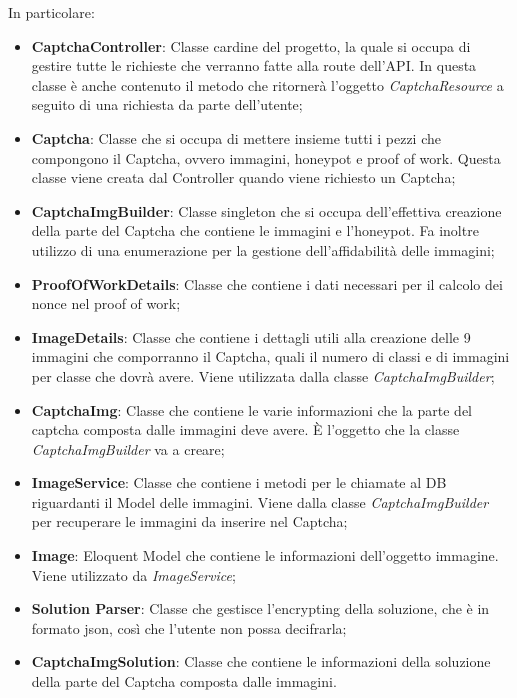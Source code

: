 In particolare:
\begin{itemize}
    \item \textbf{CaptchaController}: Classe cardine del progetto, la quale si occupa di gestire tutte le richieste che verranno fatte alla route dell'API. In questa classe è anche contenuto il metodo che ritornerà l'oggetto \textit{CaptchaResource} a seguito di una richiesta da parte dell'utente;
    \item \textbf{Captcha}: Classe che si occupa di mettere insieme tutti i pezzi che compongono il Captcha, ovvero immagini, honeypot e proof of work. Questa classe viene creata dal Controller quando viene richiesto un Captcha;
    \item \textbf{CaptchaImgBuilder}: Classe singleton che si occupa dell'effettiva creazione della parte del Captcha che contiene le immagini e l'honeypot. Fa inoltre utilizzo di una enumerazione per la gestione dell'affidabilità delle immagini;
    \item \textbf{ProofOfWorkDetails}: Classe che contiene i dati necessari per il calcolo dei nonce nel proof of work;
    \item \textbf{ImageDetails}: Classe che contiene i dettagli utili alla creazione delle 9 immagini che comporranno il Captcha, quali il numero di classi e di immagini per classe che dovrà avere. Viene utilizzata dalla classe \textit{CaptchaImgBuilder};
    \item \textbf{CaptchaImg}: Classe che contiene le varie informazioni che la parte del captcha composta dalle immagini deve avere. È l'oggetto che la classe \textit{CaptchaImgBuilder} va a creare;
    \item \textbf{ImageService}: Classe che contiene i metodi per le chiamate al DB riguardanti il Model delle immagini. Viene dalla classe \textit{CaptchaImgBuilder} per recuperare le immagini da inserire nel Captcha;
    \item \textbf{Image}: Eloquent Model che contiene le informazioni dell'oggetto immagine. Viene utilizzato da \textit{ImageService};
    \item \textbf{Solution Parser}: Classe che gestisce l'encrypting della soluzione, che è in formato json, così che l'utente non possa decifrarla;
    \item \textbf{CaptchaImgSolution}: Classe che contiene le informazioni della soluzione della parte del Captcha composta dalle immagini.
\end{itemize}

